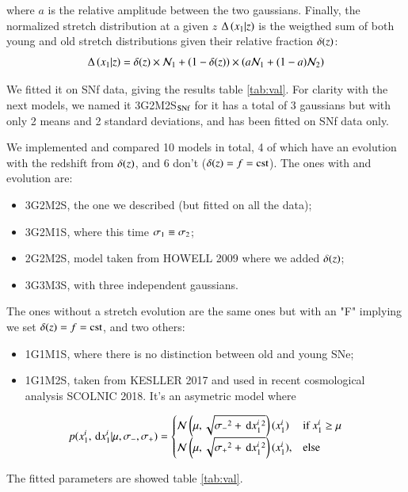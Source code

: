 \documentclass{aa}
\begin{document}
\noindent where $a$ is the relative amplitude between the two gaussians.
Finally, the normalized stretch distribution at a given $z$ $\Delta\left(x_1|z\right)$ is
the weigthed sum of both young and old stretch distributions given their
relative fraction $\delta(z)$:
\begin{equation}
    \Delta\left(x_1|z\right) = \delta(z)\times\mathcal{N}_1 +
    \left(1-\delta(z)\right) \times \left(a\mathcal{N}_1 + (1-a)\mathcal{N}_2\right)
\end{equation}

We fitted it on SNf data, giving the results table \ref{tab:val}. For clarity
with the next models, we named it 3G2M2S$_{\text{SNf}}$ for it has a total of 3
gaussians but with only 2 means and 2 standard deviations, and has been fitted
on SNf data only. 

We implemented and compared 10 models in total, 4 of which have an
evolution with the redshift from $\delta(z)$, and 6 don't ($\delta(z) = f =
\mathrm{cst}$). The ones with and evolution are:
\begin{itemize}
    \item 3G2M2S, the one we described (but fitted on all the data);
    \item 3G2M1S, where this time $\sigma_1 \equiv \sigma_2$;
    \item 2G2M2S, model taken from HOWELL 2009 where we added $\delta(z)$;
    \item 3G3M3S, with three independent gaussians.
\end{itemize}
The ones without a stretch evolution are the same ones but with an "F" implying
we set $\delta(z) = f = \mathrm{cst}$, and two others:
\begin{itemize}
    \item 1G1M1S, where there is no distinction between old and young SNe;
    \item 1G1M2S, taken from KESLLER 2017 and used in recent cosmological
        analysis SCOLNIC 2018. It's an asymetric model where
\end{itemize}
\begin{align}
 p(x_1^i, \,\mathrm{d} x_1^i | \mu, \sigma_-, \sigma_+) = 
    \begin{cases}
        \mathcal{N} \left(\mu, \sqrt{\sigma_-{}^2 + \,\mathrm{d} x_1^i{}^{2}}\right) (x_1^i) & \text{if
        } x_1^i\geq \mu\\
        \mathcal{N} \left(\mu, \sqrt{\sigma_+{}^2 + \,\mathrm{d} x_1^i{}^{2}}\right) (x_1^i), &
        \text{else}
    \end{cases}
\end{align} 

The fitted parameters are showed table \ref{tab:val}.
\end{document}
